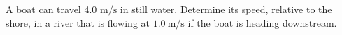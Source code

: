 A boat can travel 4.0 $\mathrm{m}/\mathrm{s}$ in still water. 
Determine its speed, relative to the shore, in a river that is flowing at 
$1.0\ \mathrm{m}/\mathrm{s}$ if the boat is heading downstream.